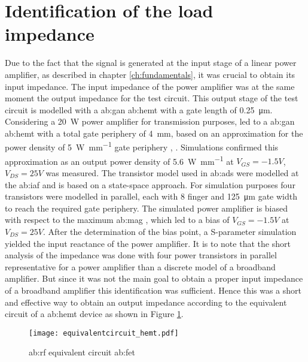 \section{Identification of the load impedance} %
Due to the fact that the signal is generated at the input stage of a linear power amplifier, as described in chapter \ref{ch:fundamentals}, it was crucial to obtain its input impedance.
The input impedance of the power amplifier was at the same moment the output impedance for the test circuit. 
This output stage of the test circuit is modelled with a \gls{ab:gan} \gls{ab:hemt} with a gate length of \SI{0.25}{\micro \meter}.
Considering a \SI{20}{\watt} power amplifier for transmission purposes, led to a \gls{ab:gan} \gls{ab:hemt} with a total gate periphery of \SI{4}{\milli \metre}, based on an approximation for the power density of \SI[per-mode=fraction]{5}{\watt\per\milli\metre} gate periphery  \cite{Maroldt2010}, \cite{GaNBook}.
Simulations confirmed this approximation as an output power density of \SI[per-mode=fraction]{5.6}{\watt\per\milli\metre} at $V_{GS} = -1.5 V$, $V_{DS} = 25 V$ was measured.
The transistor model used in \gls{ab:ads} were modelled at the \gls{ab:iaf}\cite{model} and is based on a state-space approach. 
For simulation purposes four transistors were modelled in parallel, each with 8 finger and \SI{125}{\micro \metre} gate width to reach the required gate periphery.
The simulated power amplifier is biased with respect to the maximum \gls{ab:mag} \cite{DeltimpleLeyssenneKerherveEtAl2010}, which led to a bias of $V_{GS} = -1.5 V$ at $V_{DS} = 25 V$.
After the determination of the bias point, a S-parameter simulation yielded the input reactance of the power amplifier.
It is to note that the short analysis of the impedance was done with four power transistors in parallel representative for a power amplifier than a discrete model of a broadband amplifier.
But since it was not the main goal to obtain a proper input impedance of a broadband amplifier this identification was sufficient.
Hence this was a short and effective way to obtain an output impedance according to the equivalent circuit of a \gls{ab:hemt} device as shown in Figure \ref{fig:eqcircuit}.

\begin{figure}[H] %
	\centering
  \texttt{[image: equivalentcircuit\_hemt.pdf]}
	\caption{\gls{ab:rf} equivalent circuit \gls{ab:fet} \cite{Quay2014}}
	\label{fig:eqcircuit}
\end{figure}

